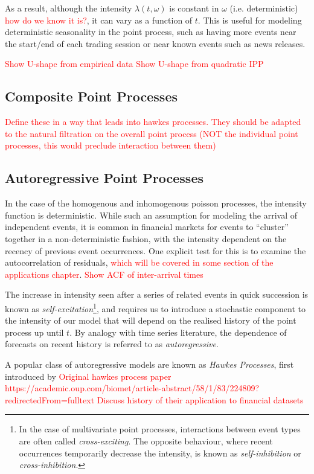 \documentclass[honours,12pt]{unswthesis}
\numberwithin{equation}{section}
\begin{document}
As a result, although the intensity $\lambda(t,\omega)$ is constant in $\omega$ (i.e. deterministic) \textcolor{red}{how do we know it is?}, it can vary as a function of $t$. This is useful for modeling deterministic seasonality in the point process, such as having more events near the start/end of each trading session or near known events such as news releases.

\textcolor{red}{Show U-shape from empirical data}
\textcolor{red}{Show U-shape from quadratic IPP}

\subsection{Composite Point Processes}
\textcolor{red}{Define these in a way that leads into hawkes processes. They should be adapted to the natural filtration on the overall point process (NOT the individual point processes, this would preclude interaction between them)}

\subsection{Autoregressive Point Processes}
In the case of the homogenous and inhomogenous poisson processes, the intensity function is deterministic. While such an assumption for modeling the arrival of independent events, it is common in financial markets for events to ``cluster'' together in a non-deterministic fashion, with the intensity dependent on the recency of previous event occurrences. One explicit test for this is to examine the autocorrelation of residuals, \textcolor{red}{which will be covered in some section of the applications chapter}.
\textcolor{red}{Show ACF of inter-arrival times}

The increase in intensity seen after a series of related events in quick succession is known as \textit{self-excitation}\footnote{In the case of multivariate point processes, interactions between event types are often called \textit{cross-exciting}. The opposite behaviour, where recent occurrences temporarily decrease the intensity, is known as \textit{self-inhibition} or \textit{cross-inhibition}.}, and requires us to introduce a stochastic component to the intensity of our model that will depend on the realised history of the point process up until $t$. By analogy with time series literature, the dependence of forecasts on recent history is referred to as \textit{autoregressive}.

A popular class of autoregressive models are known as \textit{Hawkes Processes}, first introduced by 
\textcolor{red}{Original hawkes process paper https://academic.oup.com/biomet/article-abstract/58/1/83/224809?redirectedFrom=fulltext}
\textcolor{red}{Discuss history of their application to financial datasets}
\end{document}
